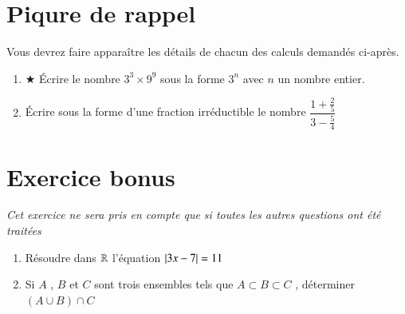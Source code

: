 \documentclass[oneside,12pt]{exam}          %
\begin{document}
\section{Piqure de rappel}
Vous devrez faire apparaître les détails de chacun des calculs demandés ci-après.
\begin{enumerate}
	\item $\bigstar$ Écrire le nombre $3^3 \times 9^9$ sous la forme $3^n$ avec $n$ un nombre entier.
	\item Écrire sous la forme d'une fraction irréductible le nombre $\dfrac{1 + \frac{2}{5}}{3 - \frac{5}{4}}$
\end{enumerate}



\section*{Exercice bonus}
\textit{Cet exercice ne sera pris en compte que si toutes les autres questions ont été traitées}
\begin{enumerate}
	\item Résoudre dans ${\mathbb R}$ l'équation ${\left\lvert 3x-7 \right\rvert} = 11$
	\item Si $A$ , $B$ et $C$ sont trois ensembles tels que $A \subset B \subset C$ , déterminer $(A \cup B) \cap C$
\end{enumerate}
\end{document}
